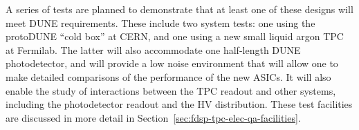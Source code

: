 A series of tests are planned to demonstrate that at least one of these designs will meet DUNE requirements. These include two system tests: one using the protoDUNE ``cold box'' at CERN, and one using a new small liquid argon TPC at Fermilab. The latter will also accommodate one half-length DUNE photodetector, and will provide a low noise environment that will allow one to make detailed comparisons of the performance of the new ASICs. It will also enable the study of interactions between the TPC readout and other systems, including the photodetector readout and the HV distribution.  These test facilities are discussed in more detail in Section~\ref{sec:fdsp-tpc-elec-qa-facilities}.
